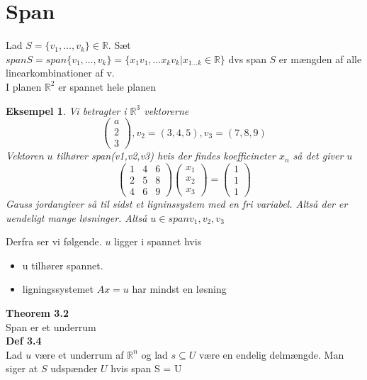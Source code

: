 \documentclass[a4paper,fleqn]{report}
\newcommand{\RR}{\mathbb{R}}
\newtheorem{example}{Eksempel}[chapter]
\begin{document}
	\section{Span}
	Lad $S = \{ v_1, \dots, v_k\} \in \RR$. Sæt \\
	$span S = span\{v_1,\dots,v_k\} = \{ x_1v_1, \dots x_k v_k | x_{1 ... k} \in \RR\}$
	dvs span $S$ er mængden af alle linearkombinationer af v.\\
	I planen $\RR^2$ er spannet hele planen\\

	\begin{example}
		Vi betragter i $\RR^3$ vektorerne\[\begin{pmatrix}a\\2\\3\end{pmatrix}, v_2 = 
		(3,4,5), v_3 = (7,8,9)\] Vektoren $u$ tilhører span(v1,v2,v3) hvis der findes
		koefficineter $x_n$ så det giver $u$\\
		\[ \begin{pmatrix}1&4&6\\2&5&8\\4&6&9\end{pmatrix}\begin{pmatrix}x_1\\x_2\\x_3\end{pmatrix}
		= \begin{pmatrix}1\\1\\1\end{pmatrix}\]
		Gauss jordangiver så til sidst et ligninssystem med en fri variabel. Altså der er
		uendeligt mange løsninger. Altså $u \in span v_1, v_2, v_3$
	\end{example}

	Derfra ser vi følgende. $u$ ligger i spannet hvis\\
	\begin{itemize}
		\item u tilhører spannet.
		\item ligningssystemet $Ax = u$ har mindst en løsning
	\end{itemize}

	\textbf{Theorem 3.2}\\
	Span er et underrum\\
	\textbf{Def 3.4}\\
	Lad $u$ være et underrum af $\RR^n$ og lad $s \subseteq U$ være en endelig delmængde. Man siger at
	$S$ udspænder $U$ hvis span S = U\\
\end{document}
